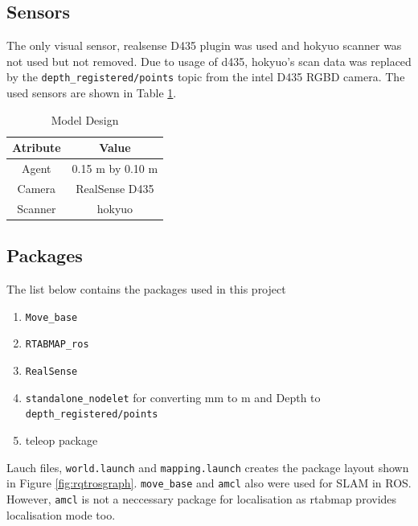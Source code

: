 \documentclass[10pt,journal,compsoc]{IEEEtran}
\begin{document}
\subsection{Sensors}
The only visual sensor, realsense D435 plugin was used and hokyuo scanner was not used but not removed. Due to usage of d435, hokyuo's scan data was replaced by the \verb!depth_registered/points! topic from the intel D435 RGBD camera.
The used sensors are shown in Table \ref{table:model_design}.
\begin{table}[ht]
      \caption{Model Design}
      \label{table:model_design}
      \begin{center}
      \begin{tabular}{|c|c|}
      \hline
      Atribute & Value \\
      \hline\hline
      Agent & 0.15 m by 0.10 m \\
      \hline
      Camera & RealSense D435 \\
      \hline
      Scanner & hokyuo \\
      \hline
      \end{tabular}
      \end{center}
\end{table}

\subsection{Packages}

The list below contains the packages used in this project
\begin{enumerate}
      \item \verb!Move_base!
      \item \verb!RTABMAP_ros!
      \item \verb!RealSense!
      \item \verb!standalone_nodelet! for converting mm to m and Depth to \verb!depth_registered/points!
      \item teleop package
\end{enumerate}
Lauch files, \verb!world.launch! and \verb!mapping.launch! creates the package layout shown in Figure \ref{fig:rqtrosgraph}. \verb!move_base! and \verb!amcl! also were used for SLAM in ROS. However, \verb!amcl! is not a neccessary package for localisation as rtabmap provides localisation mode too.
\end{document}
